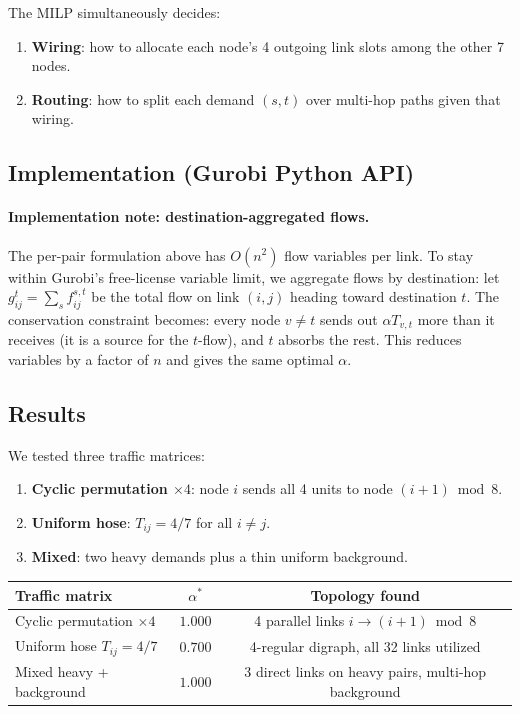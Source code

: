 \documentclass[11pt]{article}
\begin{document}
The MILP simultaneously decides:
\begin{enumerate}[nosep]
\item \textbf{Wiring}: how to allocate each node's 4 outgoing link slots
among the other 7 nodes.
\item \textbf{Routing}: how to split each demand $(s,t)$ over multi-hop
paths given that wiring.
\end{enumerate}

\subsection*{Implementation (Gurobi Python API)}



\paragraph{Implementation note: destination-aggregated flows.}
The per-pair formulation above has $O(n^2)$ flow variables per link.
To stay within Gurobi's free-license variable limit, we aggregate flows
by destination: let $g^t_{ij} = \sum_s f^{s,t}_{ij}$ be the total flow
on link $(i,j)$ heading toward destination $t$. The conservation
constraint becomes: every node $v \ne t$ sends out $\alpha T_{v,t}$ more
than it receives (it is a source for the $t$-flow), and $t$ absorbs the
rest. This reduces variables by a factor of $n$ and gives the same
optimal $\alpha$.

\subsection*{Results}

We tested three traffic matrices:
\begin{enumerate}[leftmargin=*,nosep]
\item \textbf{Cyclic permutation $\times 4$}: node $i$ sends all 4 units
to node $(i+1) \bmod 8$.
\item \textbf{Uniform hose}: $T_{ij} = 4/7$ for all $i \ne j$.
\item \textbf{Mixed}: two heavy demands plus a thin uniform background.
\end{enumerate}

\begin{center}
\begin{tabular}{lcc}
\toprule
Traffic matrix & $\alpha^*$ & Topology found \\
\midrule
Cyclic permutation $\times 4$ & $1.000$ & 4 parallel links $i \to (i{+}1)\bmod 8$ \\
Uniform hose $T_{ij}=4/7$     & $0.700$ & 4-regular digraph, all 32 links utilized \\
Mixed heavy + background      & $1.000$ & 3 direct links on heavy pairs, multi-hop background \\
\bottomrule
\end{tabular}
\end{center}
\end{document}
